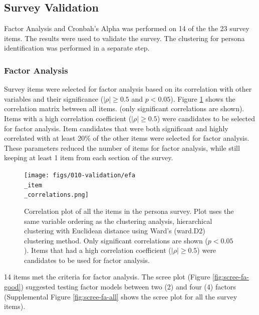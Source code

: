 \documentclass[020-persona\_validation.tex]{subfiles}
\begin{document}
    \subsection{Survey Validation}

        Factor Analysis and Cronbah's Alpha was performed on 14 of the the 23 survey items.
        The results were used to validate the survey.
        The clustering for persona identification was performed in a separate step.

    \subsubsection{Factor Analysis}

        Survey items were selected for factor analysis based on its correlation with other variables and their significance
        ($\left|\rho\right| \ge 0.5$ and $p < 0.05$).
        Figure \ref{fig:persona-item-corr} shows the correlation matrix between all items.
        (only significant correlations are shown).
        Items with a high correlation coefficient ($\left|\rho\right| \ge 0.5$) were candidates to be selected for factor analysis.
        Item candidates that were both significant and highly correlated with at least 20\% of the other items were
        selected for factor analysis.
        These parameters reduced the number of items for factor analysis,
        while still keeping at least 1 item from each section of the survey.

        \begin{figure}[!htbp]
            \centering
            \texttt{[image: figs/010-validation/efa\\\_item\\\_correlations.png]}
            \caption[Correlation matrix of persona items]
            {Correlation plot of all the items in the persona survey.
             Plot uses the same variable ordering as the clustering analysis,
             hierarchical clustering with Euclidean distance using Ward's (ward.D2) clustering method.
             Only significant correlations are shown ($p < 0.05$).
             Items that had a high correlation coefficient ($\left|\rho\right| \ge 0.5$)
             were candidates to be used for factor analysis.
            }
            \label{fig:persona-item-corr}
        \end{figure}

        14 items met the criteria for factor analysis.
        The scree plot (Figure \ref{fig:scree-fa-good}) suggested testing factor models between two (2) and four (4) factors
        (Supplemental Figure \ref{fig:scree-fa-all} shows the scree plot for all the survey items).
\end{document}
